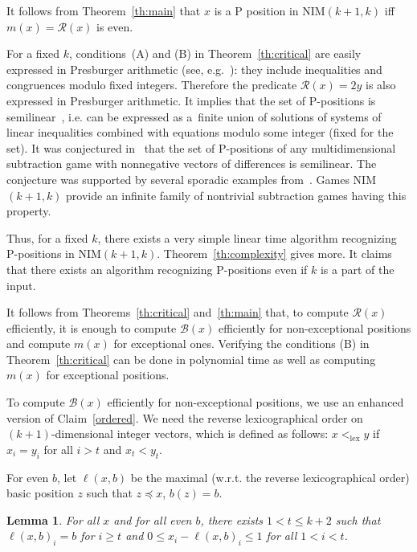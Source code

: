 \documentclass{article}
\newtheorem{lemma}{Lemma}
\theoremstyle{definition}
\def\lex{\mathrel{<_{\text{lex}}}}
\def\B{\mathcal{B}}
\def\R{\mathcal{R}}
\begin{document}
It follows from Theorem~\ref{th:main} that $x$ is a P position in NIM$(k+1,k)$ iff $m(x)=\R(x)$ is even. 

For a fixed $k$, conditions~(A) and (B) in Theorem~\ref{th:critical}  are easily expressed in Presburger arithmetic (see, e.g.~\cite{Hasse18}): they include inequalities and congruences modulo fixed integers. Therefore the predicate $\R(x)=2y$ is also expressed in Presburger arithmetic. It implies that the set of P-positions is semilinear~\cite{Hasse18}, i.e. can be expressed as a~finite union of solutions of systems of linear inequalities combined with
equations modulo some integer (fixed for the set). It was conjectured
in~\cite{GV21} that the set of P-positions of any multidimensional subtraction game with nonnegative vectors of differences is semilinear. The conjecture
was supported by several sporadic examples from~\cite{GHHC20,CGKPV21}. Games NIM$(k+1,k)$ provide an  infinite family of nontrivial subtraction games having this property. 

Thus, for a fixed $k$, there exists a very simple linear time algorithm recognizing  P-positions in  NIM$(k+1,k)$.
Theorem~\ref{th:complexity} gives more. It claims that there exists an
algorithm recognizing P-positions even if $k$ is a part of the input.

It follows from Theorems~\ref{th:critical} and~\ref{th:main} that,
to compute $\R(x)$ efficiently,  it is enough to compute  $\B(x)$ efficiently for non-exceptional positions and compute $m(x)$ for exceptional ones.
Verifying the conditions (B) in Theorem~\ref{th:critical} can be done in polynomial time as well as computing $m(x)$ for exceptional positions.

To compute  $\B(x)$ efficiently for non-exceptional positions,  we use an enhanced version of  Claim~\ref{ordered}.
We need the reverse lexicographical order on $(k+1)$-dimensional integer vectors, which is defined as follows: $x\lex y$ if $x_i=y_i$ for all $i>t$ and $x_t< y_t$.

For even $b$, let $\ell(x,b)$ be the maximal (w.r.t. the reverse lexicographical order)  basic position $z$ such that $z\preceq x$, $b(z) = b$.

\begin{lemma}\label{maxlex}
  For all $x$ and for all even $b$, there exists $1<t\leq k+2$ such that $\ell(x,b)_i = b$ for $i\geq t$ and
  $0\leq x_i-\ell(x,b)_i\leq 1$ for all $1<i<t$.
\end{lemma}
\end{document}
